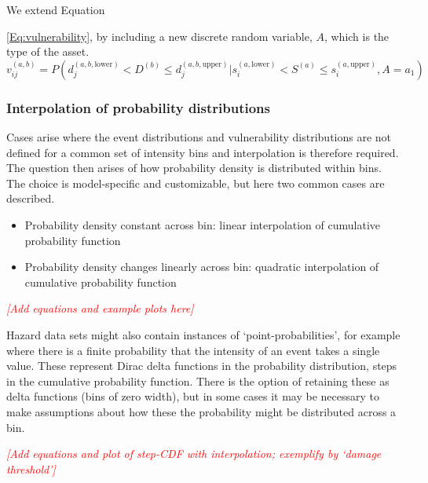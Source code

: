 \documentclass[a4paper,11pt]{extarticle} %
\begin{document}
We extend Equation~{\ref{Eq:vulnerability}, by including a new discrete random variable, $A$, which is the type of the asset.
\begin{equation}
	\label{Eq:vulnerability}  
	v^{(a, b)}_{ij} = P \left( d^{(a,b,\text{lower})}_j < D^{(b)} \le d^{(a,b,\text{upper})}_j | s^{(a, \text{lower})}_i < S^{(a)} \le s^{(a, \text{upper})}_i, A = a_1 \right)
\end{equation} 


\subsubsection{Interpolation of probability distributions}
Cases arise where the event distributions and vulnerability distributions are not defined for a common set of intensity bins and interpolation is therefore required. The question then arises of how probability density is distributed within bins. The choice is model-specific and customizable, but here two common cases are described.

\begin{itemize}
	\item Probability density constant across bin: linear interpolation of cumulative probability function
	\item Probability density changes linearly across bin: quadratic interpolation of cumulative probability function
\end{itemize}

{\textcolor{red}{\emph{[Add equations and example plots here]}}}  

Hazard data sets might also contain instances of `point-probabilities', for example where there is a finite probability that the intensity of an event takes a single value. These represent Dirac delta functions in the probability distribution, steps in the cumulative probability function. There is the option of retaining these as delta functions (bins of zero width), but in some cases it may be necessary to make assumptions about how these the probability might be distributed across a bin. 

{\textcolor{red}{\emph{[Add equations and plot of step-CDF with interpolation; exemplify by `damage threshold']}}}  

\begin{figure}[ht]
	
	\begin{framed}
		

\end{framed}
\end{figure}}
\end{document}
